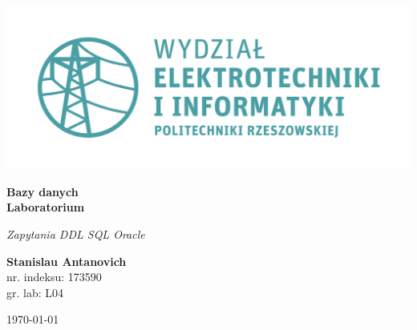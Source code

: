 \documentclass{article}
\begin{document}
\begin{titlepage}
\begin{center}
	\includegraphics[scale=0.7]{logo.png}

	\vspace*{4cm}
	\textbf{Bazy danych\\ Laboratorium}

	\vspace{1.5cm}
	\textit{Zapytania DDL SQL Oracle}

	\vspace{1.5cm}
	\textbf{Stanislau Antanovich}\\
	nr. indeksu: 173590\\
	gr. lab: L04

	\vspace{4.5cm}
	\today
\end{center}
\end{titlepage}
\end{document}
